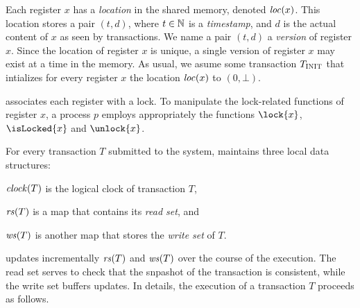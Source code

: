 Each register $x$ has a \emph{location} in the shared memory, denoted $\locationOf{x}$.
This location stores a pair $(t,d)$, where $t \in \naturalSet$ is a \emph{timestamp}, and $d$ is the actual content of $x$ as seen by transactions.
We name a pair $(t,d)$ a \emph{version} of register $x$.
Since the location of register $x$ is unique, a single version of register $x$ may exist at a time in the memory.
As usual, we asume some transaction $\transInit$ that intializes for every register $x$ the location $\locationOf{x}$ to $(0,\bot)$.

 associates each register with a lock.
To manipulate the lock-related functions of register $x$, 
a process $p$ employs appropriately the functions $\lock{x}$, $\isLocked{x}$ and $\unlock{x}$.

For every transaction $T$ submitted to the system,  maintains three local data structures:
\begin{inparaenum}[]
\item $\clockOf{T}$ is the logical clock of transaction $T$,
\item $\readSetOf{T}$ is a map that contains its \emph{read set}, and 
\item $\writeSetOf{T}$ is another map that stores the \emph{write set} of $T$.
\end{inparaenum}
 updates incrementally $\readSetOf{T}$ and $\writeSetOf{T}$ over the course of the execution.
The read set serves to check that the snpashot of the transaction is consistent, while the write set buffers updates.
In details, the execution of a transaction $T$ proceeds as follows.

